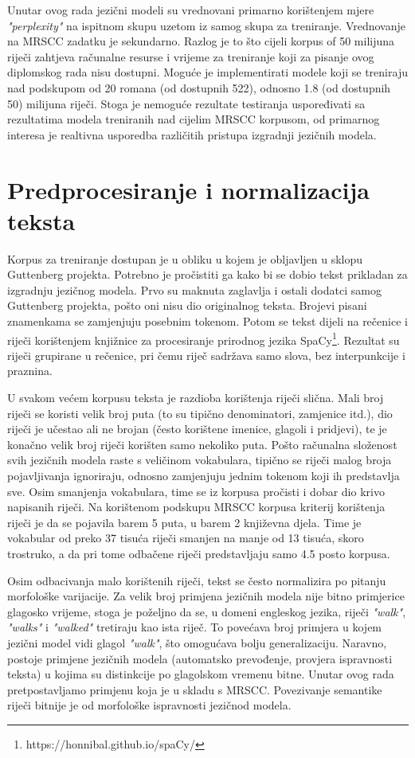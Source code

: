 \documentclass[times, utf8, diplomski, numeric]{fer}
\begin{document}
Unutar ovog rada jezični modeli su vrednovani primarno korištenjem mjere \textit{"perplexity"} na ispitnom skupu uzetom iz samog skupa za treniranje. Vrednovanje na MRSCC zadatku je sekundarno. Razlog je to što cijeli korpus of 50 milijuna riječi zahtjeva računalne resurse i vrijeme za treniranje koji za pisanje ovog diplomskog rada nisu dostupni. Moguće je implementirati modele koji se treniraju nad podskupom od 20 romana (od dostupnih 522), odnosno 1.8 (od dostupnih 50) milijuna riječi. Stoga je nemoguće rezultate testiranja uspoređivati sa rezultatima modela treniranih nad cijelim MRSCC korpusom, od primarnog interesa je realtivna usporedba različitih pristupa izgradnji jezičnih modela.

\section{Predprocesiranje i normalizacija teksta}

Korpus za treniranje dostupan je u obliku u kojem je obljavljen u sklopu Guttenberg projekta. Potrebno je pročistiti ga kako bi se dobio tekst prikladan za izgradnju jezičnog modela. Prvo su maknuta zaglavlja i ostali dodatci samog Guttenberg projekta, pošto oni nisu dio originalnog teksta. Brojevi pisani znamenkama se zamjenjuju posebnim tokenom. Potom se tekst dijeli na rečenice i riječi korištenjem knjižnice za procesiranje prirodnog jezika SpaCy\footnote{https://honnibal.github.io/spaCy/}. Rezultat su riječi grupirane u rečenice, pri čemu riječ sadržava samo slova, bez interpunkcije i praznina.

U svakom većem korpusu teksta je razdioba korištenja riječi slična. Mali broj riječi se koristi velik broj puta (to su tipično denominatori, zamjenice itd.), dio riječi je učestao ali ne brojan (često korištene imenice, glagoli i pridjevi), te je konačno velik broj riječi korišten samo nekoliko puta. Pošto računalna složenost svih jezičnih modela raste s veličinom vokabulara, tipično se riječi malog broja pojavljivanja ignoriraju, odnosno zamjenjuju jednim tokenom koji ih predstavlja sve. Osim smanjenja vokabulara, time se iz korpusa pročisti i dobar dio krivo napisanih riječi. Na korištenom podskupu MRSCC korpusa kriterij korištenja riječi je da se pojavila barem 5 puta, u barem 2 književna djela. Time je vokabular od preko 37 tisuća riječi smanjen na manje od 13 tisuća, skoro trostruko, a da pri tome odbačene riječi predstavljaju samo 4.5 posto korpusa.

Osim odbacivanja malo korištenih riječi, tekst se često normalizira po pitanju morfološke varijacije. Za velik broj primjena jezičnih modela nije bitno primjerice glagosko vrijeme, stoga je poželjno da se, u domeni engleskog jezika, riječi \textit{"walk"}, \textit{"walks"} i \textit{"walked"} tretiraju kao ista riječ. To povećava broj primjera u kojem jezični model vidi glagol \textit{"walk"}, što omogućava bolju generalizaciju. Naravno, postoje primjene jezičnih modela (automatsko prevođenje, provjera ispravnosti teksta) u kojima su distinkcije po glagolskom vremenu bitne. Unutar ovog rada pretpostavljamo primjenu koja je u skladu s MRSCC. Povezivanje semantike riječi bitnije je od morfološke ispravnosti jezičnod modela.
\end{document}
